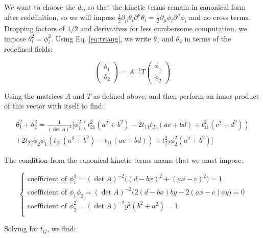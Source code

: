 \documentclass{article}
\begin{document}
We want to choose the $d_{ij}$ so that the kinetic terms remain in canonical form after redefinition, so we will impose  $\frac{1}{2}\partial_\mu\theta_i \partial^\mu\theta_i = \frac{1}{2}\partial_\mu\phi_i \partial^\mu\phi_i $ and no cross terms. Dropping factors of $1/2$ and derivatives for less cumbersome computation, we impose $\theta_i^2 = \phi^2_i$. Using Eq. \eqref{eq:triang}, we write $\theta_1$ and $\theta_2$ in terms of the redefined fields:

\begin{equation}
    \begin{pmatrix}
        \theta_1 \\
        \theta_2
    \end{pmatrix}
    = 
   A^{-1} T 
    \begin{pmatrix}
        \phi_1 \\
        \phi_2
    \end{pmatrix}
\end{equation}

\noindent Using the matrices $A$ and $T$ as defined above, and then perform an inner product of this vector with itself to find:

\begin{align*}
     \label{eq:dotprod}
    \theta_1^2+\theta_2^2 = \frac{1}{(\det{A})^2} \big[ 
    \phi_1^2 \left(t_{21}^2 \left(a^2+b^2\right)-2 t_{11}t_{21} (a c+b d)+t_{11}^2 \left(c^2+d^2\right)\right) \\
    + 2 t_{22} \phi _2 \phi _1 \left(t_{21}\left(a^2+b^2\right)-t_{11} (a c+b d)\right)+t_{22}^2 \phi _2^2 \left(a^2+b^2\right)
    \big]
\end{align*}

The condition from the canonical kinetic terms means that we must impose:

\begin{equation}
    \label{eq:constraints}
    \begin{cases}
        \text{coefficient of }\phi_1^2 = (\det{A})^{-2}\big((d-bx)^2+(ax-c)^2\big)= 1 \\
        \text{coefficient of }\phi_1\phi_2 = (\det{A})^{-2}\big(2(d-bx)by-2(ax-c)ay\big)= 0 \\
        \text{coefficient of }\phi_2^2 = (\det{A})^{-2}y^2(b^2+a^2) =1 \\
    \end{cases}
\end{equation}

Solving for $t_{ij}$, we find:
\end{document}
